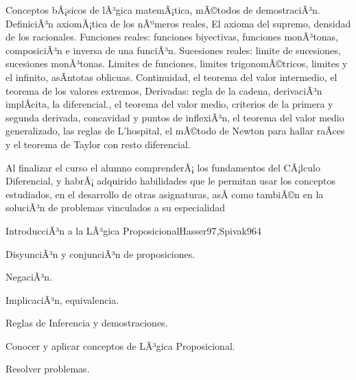 \begin{syllabus}


\begin{justification}
Conceptos bÃ¡sicos de lÃ³gica matemÃ¡tica, mÃ©todos de demostraciÃ³n. DefiniciÃ³n axiomÃ¡tica de los nÃºmeros reales, El axioma del supremo, densidad de los racionales. Funciones reales: funciones biyectivas, funciones monÃ³tonas, composiciÃ³n e inversa de una funciÃ³n. Sucesiones reales: limite de sucesiones, sucesiones monÃ³tonas.  Limites de funciones, limites trigonomÃ©tricos, limites y el infinito, asÃ­ntotas  oblicuas. Continuidad, el teorema del valor intermedio, el teorema de los valores extremos, Derivadas: regla de la cadena, derivaciÃ³n implÃ­cita, la diferencial., el teorema del valor medio, criterios de la primera y segunda derivada, concavidad y puntos de inflexiÃ³n, el teorema del valor medio generalizado, las reglas de L'hospital, el mÃ©todo de Newton para hallar raÃ­ces y el  teorema de Taylor  con resto diferencial.
\end{justification}

\begin{goals}
\item Al finalizar el curso el alumno comprenderÃ¡ los fundamentos del CÃ¡lculo Diferencial, y habrÃ¡ adquirido habilidades que le permitan usar los conceptos estudiados, en el desarrollo de otras asignaturas, asÃ­ como tambiÃ©n en la soluciÃ³n de problemas vinculados a su especialidad 
\end{goals}

\begin{outcomes}
\end{outcomes}

\begin{unit}{IntroducciÃ³n a la LÃ³gica Proposicional}{Hasser97,Spivak96}{4}
\begin{topics}
      \item DisyunciÃ³n y conjunciÃ³n de proposiciones.
      \item NegaciÃ³n.
      \item ImplicaciÃ³n, equivalencia.
      \item Reglas de Inferencia y demostraciones.
   \end{topics}

   \begin{unitgoals}
      \item Conocer y aplicar conceptos de LÃ³gica Proposicional.
	\item Resolver problemas.
   \end{unitgoals}
\end{unit}


\end{syllabus}
